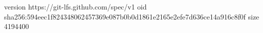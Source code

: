 version https://git-lfs.github.com/spec/v1
oid sha256:594eec1f824348062457369e087b0b0d1861e2165e2efe7d636ce14a916c8f0f
size 4194400
